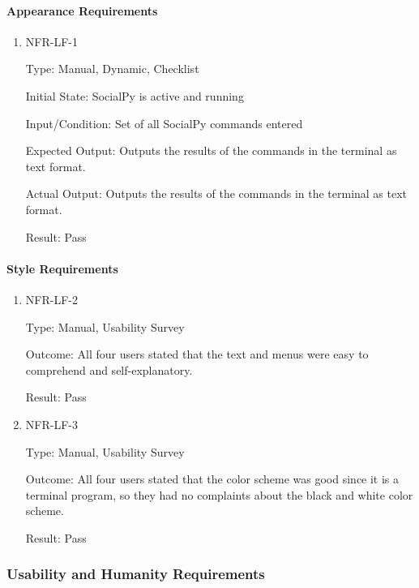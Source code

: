 \documentclass[12pt, titlepage]{article}
\begin{document}
\paragraph{Appearance Requirements}

\begin{enumerate}

\item{NFR-LF-1\\}

Type: Manual, Dynamic, Checklist
					
Initial State: SocialPy is active and running
					
Input/Condition: Set of all SocialPy commands entered
					
Expected Output: Outputs the results of the commands in the terminal as text format.
					
Actual Output: Outputs the results of the commands in the terminal as text format.
					
Result: Pass

\end{enumerate}

\paragraph{Style Requirements}

\begin{enumerate}

\item{NFR-LF-2\\}

Type: Manual, Usability Survey

Outcome: All four users stated that the text and menus were easy to comprehend and self-explanatory.			
					
Result: Pass

\item{NFR-LF-3\\}

Type: Manual, Usability Survey

Outcome: All four users stated that	the color scheme was good since it is a terminal program, so they had no complaints about the black and white color scheme.		
					
Result: Pass
\end{enumerate}

\subsubsection{Usability and Humanity Requirements}
\end{document}
